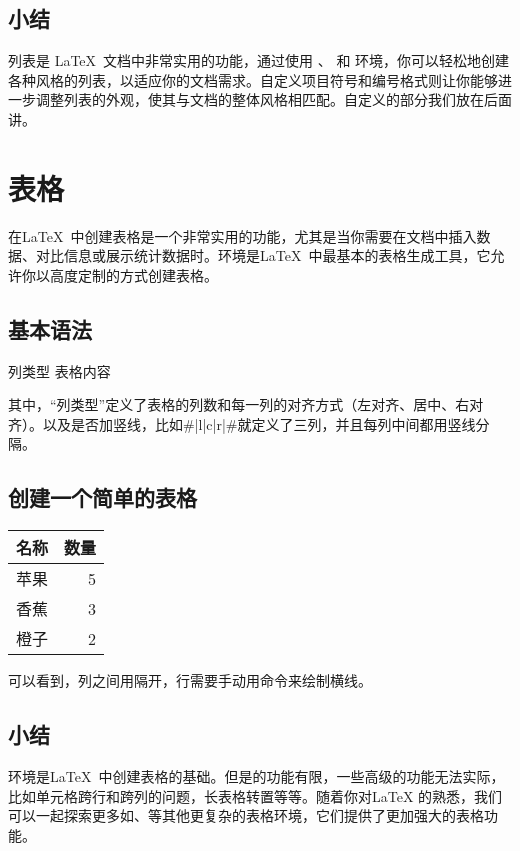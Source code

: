 {\subsection{小结}
列表是 \LaTeX\ 文档中非常实用的功能，通过使用 、 和 
环境，你可以轻松地创建各种风格的列表，以适应你的文档需求。自定义项目符号和编号格式则让你能够进一步调整列表的外观，使其与文档的整体风格相匹配。自定义的部分我们放在后面讲。

\section{表格}
在\LaTeX\
中创建表格是一个非常实用的功能，尤其是当你需要在文档中插入数据、对比信息或展示统计数据时。环境是\LaTeX\ 中最基本的表格生成工具，它允许你以高度定制的方式创建表格。

\subsection{基本语法}

\begin{texlst}
\begin{tabular}{列类型}
    表格内容
\end{tabular}
\end{texlst}

其中，\enquote{列类型}定义了表格的列数和每一列的对齐方式（左对齐、居中、右对齐）。以及是否加竖线\texinline{|}，比如\texinline#{|l|c|r|}#就定义了三列，并且每列中间都用竖线分隔。

\subsection{创建一个简单的表格}
\begin{texlst}
\begin{tabular}{|c|r|}
    \hline
    名称 & 数量 \\ \hline
    苹果 & 5 \\
    香蕉 & 3 \\
    橙子 & 2 \\
    \hline
\end{tabular}
\end{texlst}
可以看到，列之间用\texinline{&}隔开，行需要手动用\texinline{\hline}命令来绘制横线。

\subsection{小结}
环境是\LaTeX\
中创建表格的基础。但是的功能有限，一些高级的功能无法实际，比如单元格跨行和跨列的问题，长表格转置等等。随着你对\LaTeX
的熟悉，我们可以一起探索更多如、等其他更复杂的表格环境，它们提供了更加强大的表格功能。

}
